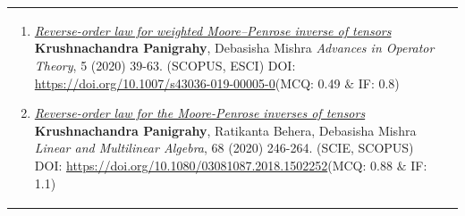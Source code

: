 \documentclass[a4paper,12pt]{article}
\begin{document}
\begin{longtable}{lp{15cm}}
\begin{enumerate}[resume=pubs]
\item \href{https://doi.org/10.1007/s43036-019-00005-0}{\it Reverse-order law for weighted Moore–Penrose inverse of tensors}\newline
{\footnotesize
{\bf Krushnachandra Panigrahy},  Debasisha Mishra\newline
\textcolor{source}{\it Advances in Operator Theory},  5 (2020) 39-63. \hfill{(SCOPUS, ESCI)}\newline
DOI: \href{https://doi.org/10.1007/s43036-019-00005-0}{https://doi.org/10.1007/s43036-019-00005-0}\hfill(MCQ: 0.49 $\&$ IF: 0.8)
}

\item \href{https://doi.org/10.1080/03081087.2018.1502252}{\it Reverse-order law for the Moore-Penrose inverses of tensors}\newline
{\footnotesize 
{\bf Krushnachandra Panigrahy}, Ratikanta Behera,  Debasisha Mishra\newline
\textcolor{source}{\it Linear and Multilinear Algebra},
68 (2020) 246-264. \hfill{(SCIE, SCOPUS)}\newline
DOI: \href{https://doi.org/10.1080/03081087.2018.1502252}{https://doi.org/10.1080/03081087.2018.1502252}\hfill(MCQ: 0.88 $\&$ IF: 1.1)
}
\end{enumerate}\\[0.5cm]

\end{longtable}
\end{document}
